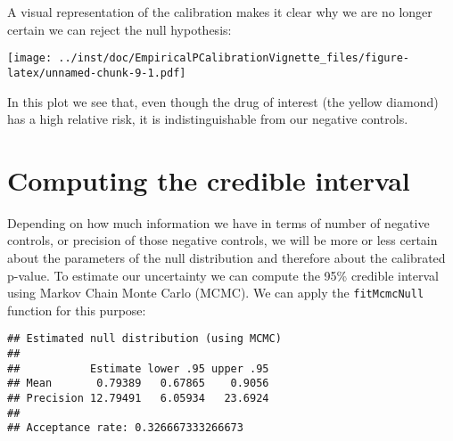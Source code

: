 \documentclass[]{article}
\newenvironment{Shaded}{\begin{snugshade}}{\end{snugshade}}
\newcommand{\KeywordTok}[1]{\textcolor[rgb]{0.13,0.29,0.53}{\textbf{#1}}}
\newcommand{\NormalTok}[1]{#1}
\newcommand{\OperatorTok}[1]{\textcolor[rgb]{0.81,0.36,0.00}{\textbf{#1}}}
\newcommand{\StringTok}[1]{\textcolor[rgb]{0.31,0.60,0.02}{#1}}
\begin{document}
A visual representation of the calibration makes it clear why we are no
longer certain we can reject the null hypothesis:

\begin{Shaded}
\end{Shaded}

\texttt{[image: ../inst/doc/EmpiricalPCalibrationVignette\_files/figure-latex/unnamed-chunk-9-1.pdf]}

In this plot we see that, even though the drug of interest (the yellow
diamond) has a high relative risk, it is indistinguishable from our
negative controls.

\hypertarget{computing-the-credible-interval}{%
\section{Computing the credible
interval}\label{computing-the-credible-interval}}

Depending on how much information we have in terms of number of negative
controls, or precision of those negative controls, we will be more or
less certain about the parameters of the null distribution and therefore
about the calibrated p-value. To estimate our uncertainty we can compute
the 95\% credible interval using Markov Chain Monte Carlo (MCMC). We can
apply the \texttt{fitMcmcNull} function for this purpose:

\begin{Shaded}
\end{Shaded}

\begin{verbatim}
## Estimated null distribution (using MCMC)
## 
##           Estimate lower .95 upper .95
## Mean       0.79389   0.67865    0.9056
## Precision 12.79491   6.05934   23.6924
## 
## Acceptance rate: 0.326667333266673
\end{verbatim}
\end{document}
